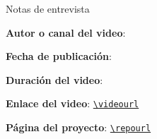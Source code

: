 
\begin{titlepage}
\centering
{\Large Notas de entrevista\par}
\vspace{1.2cm}
{\huge\bfseries \notetitle\par}
\vspace{0.8cm}
{\large \noteauthors\par}
\vspace{0.3cm}
{\large \notedate\par}
\vspace{1.2cm}

\rendercover

\vfill
\begin{tcolorbox}[width=0.9\textwidth, colback=black!2!white, colframe=black!60, sharp corners]
\textbf{Autor o canal del video}: \videochannel\par
\textbf{Fecha de publicación}: \videopublishdate\par
\textbf{Duración del video}: \videoduration\par
\textbf{Enlace del video}: \href{\videourl}{\nolinkurl{\videourl}}\par
\textbf{Página del proyecto}: \href{\repourl}{\nolinkurl{\repourl}}\par
\end{tcolorbox}
\end{titlepage}

\tableofcontents
\newpage

